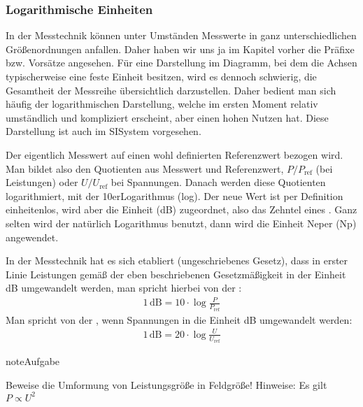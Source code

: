 \documentclass[letterpaper,10pt,english]{jupyterBook}
\begin{document}
\sphinxAtStartPar
{}


\subsubsection{Logarithmische Einheiten}
\label{\detokenize{content/1_Messen_Einheit:logarithmische-einheiten}}
\sphinxAtStartPar
In der Messtechnik können unter Umständen Messwerte in ganz unterschiedlichen Größenordnungen anfallen. Daher haben wir uns ja im Kapitel vorher die Präfixe bzw. Vorsätze angesehen. Für eine Darstellung im Diagramm, bei dem die Achsen typischerweise eine feste Einheit besitzen, wird es dennoch schwierig, die Gesamtheit der Messreihe übersichtlich darzustellen. Daher bedient man sich häufig der logarithmischen Darstellung, welche im ersten Moment relativ umständlich und kompliziert erscheint, aber einen hohen Nutzen hat. Diese Darstellung ist auch im SI\sphinxhyphen{}System vorgesehen.

\sphinxAtStartPar
Der eigentlich Messwert auf einen wohl definierten Referenzwert bezogen wird. Man bildet also den Quotienten aus Messwert und Referenzwert, \(P/P_\mathrm{ref}\) (bei Leistungen) oder \(U/U_\mathrm{ref}\) bei Spannungen. Danach werden diese Quotienten logarithmiert,  mit der 10er\sphinxhyphen{}Logarithmus (log). Der neue Wert ist per Definition einheitenlos, wird aber die Einheit  (dB) zugeordnet, also das Zehntel eines . Ganz selten wird der natürlich Logarithmus benutzt, dann wird die Einheit Neper (Np) angewendet.

\sphinxAtStartPar
In der Messtechnik hat es sich etabliert (ungeschriebenes Gesetz), dass in erster Linie Leistungen gemäß der eben beschriebenen Gesetzmäßigkeit in der Einheit dB umgewandelt werden, man spricht hierbei von der :
\begin{equation*}
\begin{split}1\,\mathrm{dB} = 10 \cdot \log\frac{P}{P_\mathrm{ref}}\end{split}
\end{equation*}
\sphinxAtStartPar
Man spricht von der , wenn Spannungen in die Einheit dB umgewandelt werden:
\begin{equation*}
\begin{split}1\,\mathrm{dB} = 20 \cdot \log\frac{U}{U_\mathrm{ref}}\end{split}
\end{equation*}
\begin{sphinxadmonition}{note}{Aufgabe}

\sphinxAtStartPar
Beweise die Umformung von Leistungsgröße in Feldgröße! Hinweise: Es gilt \(P \propto U^2\)
\end{sphinxadmonition}
\end{document}
